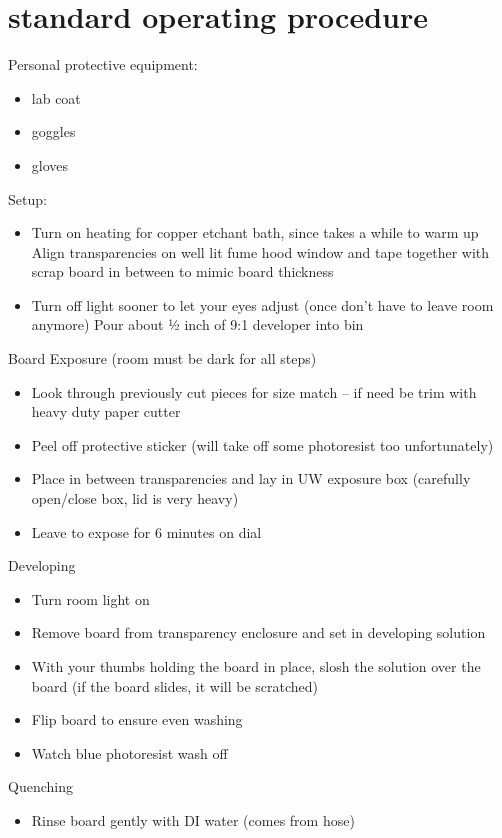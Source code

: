 \documentclass{training}
\begin{document}
\clearpage
\section{standard operating procedure}

Personal protective equipment:
\begin{itemize}
  \item lab coat
  \item goggles
  \item gloves
\end{itemize}

Setup:
\begin{itemize}
  \item Turn on heating for copper etchant bath, since takes a while to warm up
Align transparencies on well lit fume hood window and tape together with scrap board in between to mimic board thickness
  \item Turn off light sooner to let your eyes adjust (once don’t have to leave room anymore)
Pour about ½ inch of 9:1 developer into bin
\end{itemize}

Board Exposure (room must be dark for all steps)
\begin{itemize}
  \item Look through previously cut pieces for size match -- if need be trim with heavy duty paper cutter
  \item Peel off protective sticker (will take off some photoresist too unfortunately)
  \item Place in between transparencies and lay in UW exposure box (carefully open/close box, lid is very heavy)
  \item Leave to expose for 6 minutes on dial
\end{itemize}

Developing
\begin{itemize}
  \item Turn room light on
  \item Remove board from transparency enclosure and set in developing solution
  \item With your thumbs holding the board in place, slosh the solution over the board (if the board slides, it will be scratched)
  \item Flip board to ensure even washing
  \item Watch blue photoresist wash off
\end{itemize}

Quenching
\begin{itemize}
  \item Rinse board gently with DI water (comes from hose)
\end{itemize}
\end{document}
